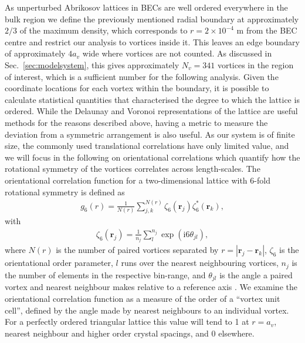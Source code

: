 As unperturbed Abrikosov lattices in BECs are well ordered everywhere in the bulk region \cite{Vtx:Anglin_arxiv_2002} we define the previously mentioned radial boundary at approximately $2/3$ of the maximum density, which corresponds to $r=2\times 10^{-4}$ m from the BEC centre and restrict our analysis to vortices inside it. This leaves an edge boundary of approximately $4a_v$ wide where vortices are not counted. As discussed in Sec.~\ref{sec:modelsystem}, this gives approximately $N_v=341$ vortices in the region of interest, which is a sufficient number for the following analysis. Given the coordinate locations for each vortex within the boundary, it is possible to calculate statistical quantities that characterised the degree to which the lattice is ordered. While the Delaunay and Voronoi representations of the lattice are useful methods for the reasons described above, having a metric to measure the deviation from a symmetric arrangement is also useful. As our system is of finite size, the commonly used translational correlations have only limited value, and we will focus in the following on orientational correlations which quantify how the rotational symmetry of the vortices correlates across length-scales. The orientational correlation function for a two-dimensional lattice with 6-fold rotational symmetry is defined as
\begin{align}
	g_6(r) = \frac{1}{N(r)}\displaystyle\sum\limits_{j,k}^{N(r)}\zeta_6(\mathbf{r}_j)\zeta_6^{*}(\mathbf{r}_k),
\end{align}
with
\begin{align}
	\zeta_6(\mathbf{r}_{j}) =  \frac{1}{n_j}\displaystyle\sum\limits_{l}^{n_j}\exp(\mathrm{i}6\theta_{jl}),
\end{align}
where $N(r)$ is the number of paired vortices separated by $r=|\mathbf{r}_j - \mathbf{r}_k|$, $\zeta_6$ is the orientational order parameter, $l$ runs over the nearest neighbouring vortices, $n_j$ is the number of elements in the respective bin-range, and $\theta_{jl}$ is the angle a paired vortex and nearest neighbour makes relative to a reference axis \cite{Guillamon_nat_2014}. We examine the orientational correlation function as a measure of the order of a ``vortex unit cell'', defined by the angle made by nearest neighbours to an individual vortex. For a perfectly ordered triangular lattice this value will tend to 1 at $r=a_v$,  nearest neighbour and higher order crystal spacings, and 0 elsewhere.

